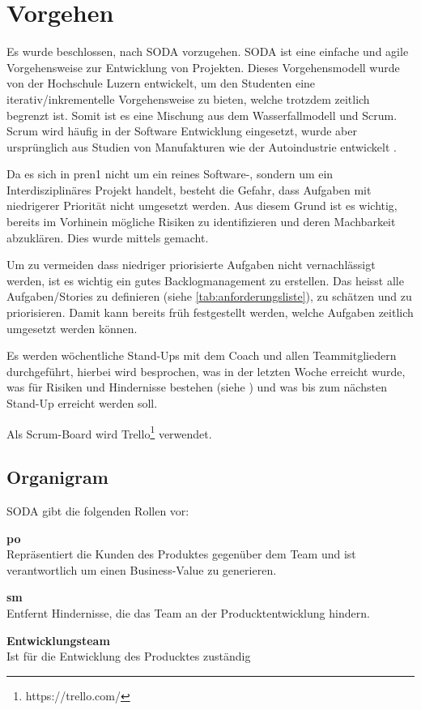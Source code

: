 \newpage
\section{Vorgehen}
Es wurde beschlossen, nach SODA \cite{Wikipedia-Scrum} vorzugehen.
SODA ist eine einfache und agile Vorgehensweise zur Entwicklung von Projekten. Dieses Vorgehensmodell wurde von der Hochschule Luzern entwickelt, um den Studenten eine iterativ/inkrementelle Vorgehensweise zu bieten, welche trotzdem zeitlich begrenzt ist. Somit ist es eine Mischung aus dem Wasserfallmodell und Scrum. Scrum wird häufig in der Software Entwicklung eingesetzt, wurde aber ursprünglich aus Studien von Manufakturen wie der Autoindustrie entwickelt \cite{Wikipedia-Scrum-History}.

Da es sich in \acrshort{pren1} nicht um ein reines Software-, sondern um
ein Interdisziplinäres Projekt handelt, besteht die Gefahr, dass Aufgaben
mit niedrigerer Priorität nicht umgesetzt werden. Aus diesem Grund ist es
wichtig, bereits im Vorhinein mögliche Risiken zu identifizieren und deren Machbarkeit
abzuklären. Dies wurde mittels  gemacht.

Um zu vermeiden dass niedriger priorisierte Aufgaben nicht vernachlässigt werden,
ist es wichtig ein gutes Backlogmanagement zu erstellen. Das heisst alle Aufgaben/Stories zu definieren (siehe \ref{tab:anforderungsliste}), zu schätzen und zu priorisieren. Damit kann bereits früh festgestellt werden, welche Aufgaben zeitlich umgesetzt werden können.

Es werden wöchentliche Stand-Ups mit dem Coach und allen Teammitgliedern durchgeführt, hierbei wird besprochen, was in der letzten Woche erreicht wurde, was für Risiken und Hindernisse bestehen (siehe ) und was bis zum nächsten Stand-Up erreicht werden soll.

Als Scrum-Board wird Trello\footnote{https://trello.com/} verwendet.

\subsection{Organigram}
SODA gibt die folgenden Rollen vor:

\begin{items}
  \item {\bf \acrfull{po}} \\
    Repräsentiert die Kunden des Produktes gegenüber dem Team 
    und ist verantwortlich um einen Business-Value zu generieren.
  \item {\bf \acrfull{sm}} \\
    Entfernt Hindernisse, die das Team an der Producktentwicklung hindern.
  \item {\bf Entwicklungsteam} \\
    Ist für die Entwicklung des Producktes zuständig
\end{items}

